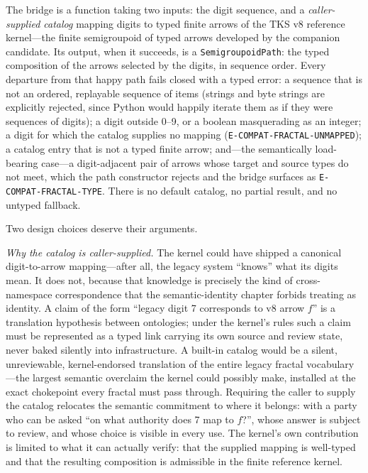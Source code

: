 The bridge is a function taking two inputs: the digit sequence, and a \emph{caller-supplied catalog} mapping digits to typed finite arrows of the TKS v8 reference kernel---the finite semigroupoid of typed arrows developed by the companion candidate. Its output, when it succeeds, is a \texttt{SemigroupoidPath}: the typed composition of the arrows selected by the digits, in sequence order. Every departure from that happy path fails closed with a typed error: a sequence that is not an ordered, replayable sequence of items (strings and byte strings are explicitly rejected, since Python would happily iterate them as if they were sequences of digits); a digit outside 0--9, or a boolean masquerading as an integer; a digit for which the catalog supplies no mapping (\texttt{E-COMPAT-FRACTAL-UNMAPPED}); a catalog entry that is not a typed finite arrow; and---the semantically load-bearing case---a digit-adjacent pair of arrows whose target and source types do not meet, which the path constructor rejects and the bridge surfaces as \texttt{E-COMPAT-FRACTAL-TYPE}. There is no default catalog, no partial result, and no untyped fallback.

Two design choices deserve their arguments.

\emph{Why the catalog is caller-supplied.} The kernel could have shipped a canonical digit-to-arrow mapping---after all, the legacy system ``knows'' what its digits mean. It does not, because that knowledge is precisely the kind of cross-namespace correspondence that the semantic-identity chapter forbids treating as identity. A claim of the form ``legacy digit 7 corresponds to v8 arrow $f$'' is a translation hypothesis between ontologies; under the kernel's rules such a claim must be represented as a typed link carrying its own source and review state, never baked silently into infrastructure. A built-in catalog would be a silent, unreviewable, kernel-endorsed translation of the entire legacy fractal vocabulary---the largest semantic overclaim the kernel could possibly make, installed at the exact chokepoint every fractal must pass through. Requiring the caller to supply the catalog relocates the semantic commitment to where it belongs: with a party who can be asked ``on what authority does 7 map to $f$?'', whose answer is subject to review, and whose choice is visible in every use. The kernel's own contribution is limited to what it can actually verify: that the supplied mapping is well-typed and that the resulting composition is admissible in the finite reference kernel.

